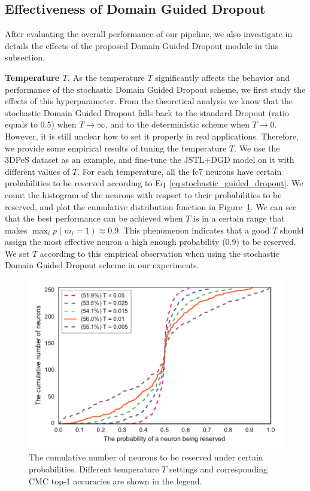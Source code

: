 \subsection{Effectiveness of Domain Guided Dropout} %
\label{sub:effectiveness_of_the_guided_dropout_module}

After evaluating the overall performance of our pipeline, we also investigate in details the effects of the proposed Domain Guided Dropout module in this subsection.

\textbf{Temperature $T$.} As the temperature $T$ significantly affects the behavior and performance of the stochastic Domain Guided Dropout scheme, we first study the effects of this hyperparameter. From the theoretical analysis we know that the stochastic Domain Guided Dropout falls back to the standard Dropout (ratio equals to 0.5) when $T\to \infty$, and to the deterministic scheme when $T\to 0$. However, it is still unclear how to set it properly in real applications. Therefore, we provide some empirical results of tuning the temperature $T$. We use the 3DPeS dataset as an example, and fine-tune the JSTL+DGD model on it with different values of $T$. For each temperature, all the fc7 neurons have certain probabilities to be reserved according to Eq~\eqref{eq:stochastic_guided_dropout}. We count the histogram of the neurons with respect to their probabilities to be reserved, and plot the cumulative distribution function in Figure~\ref{fig:temp_cdf}. We can see that the best performance can be achieved when $T$ is in a certain range that makes $\max_i p(m_i=1) \approx 0.9$. This phenomenon indicates that a good $T$ should assign the most effective neuron a high enough probability (0.9) to be reserved. We set $T$ according to this empirical observation when using the stochastic Domain Guided Dropout scheme  in our experiments.

\begin{figure}[t]
\begin{center}
\includegraphics[width=1.0\linewidth]{figures/multi_domain/cdf_temperature.pdf}
\end{center}
\caption{The cumulative number of neurons to be reserved under certain probabilities. Different temperature $T$ settings and corresponding CMC top-1 accuracies are shown in the legend.}
\label{fig:temp_cdf}
\end{figure}

